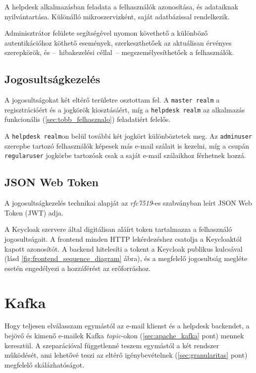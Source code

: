 A helpdesk alkalmazásban feladata a felhasználók azonosítása, és adataiknak nyilvántartása. Különálló mikroszervizként, saját adatbázissal rendelkezik.

Adminisztrátor felülete segítségével nyomon követhető a különböző autentikációhoz köthető események, szerkeszthetőek az aktuálisan érvényes szerepkörök, és --~hibakezelési céllal~-- megszemélyesíthetőek a felhasználók.


\subsection{Jogosultságkezelés}\label{sec:Jogosultságkezelés}
A jogosultságokat két eltérő területre osztottam fel. A \texttt{master realm} a regisztrációért és a jogkörök kiosztásáért, míg a \texttt{helpdesk realm} az alkalmazás funkcionális (\ref{sec:tobb_felhasznalo}) feladatiért felelős.

A \texttt{helpdesk realm}on belül további két jogkört különböztetek meg. Az \texttt{admin\textunderscore user} szerepbe tartozó felhasználók képesek más e-mail szálait is kezelni, míg a csupán \texttt{regular\textunderscore user} jogkörbe tartozóak csak a saját e-mail szálaikhoz férhetnek hozzá.


\subsection{JSON Web Token}\label{sec:JWT}
A jogosultságkezelés technikai alapját az \emph{rfc7519}-es szabványban \cite{rfc7519_JSON_Web_Token} leírt JSON Web Token (JWT) adja. 

A Keycloak szervere által digitálisan aláírt token tartalmazza a felhasználó jogosultságait. A frontend minden HTTP lekérdezéshez csatolja a Keycloaktól kapott azonosítót. A backend hitelesíti a tokent a Keycloak publikus kulcsával (lásd \ref{fig:frontend_sequence_diagram} ábra), és a megfelelő jogosultság megléte esetén engedélyezi a hozzáférést az erőforráshoz.


\section{Kafka}\label{sec:implementacio_kafka}
Hogy teljesen elválasszam egymástól az e-mail klienst és a helpdesk backendet, a bejövő és kimenő e-mailek Kafka \emph{topic}-okon (\ref{sec:apache_kafka} pont) mennek keresztül. A szeparációval függetlenné teszem egymástól a két rendszer működését, ami lehetővé teszi az eltérő igénybevételnek (\ref{sec:granularitas} pont) megfelelő skálázhatóságot.

